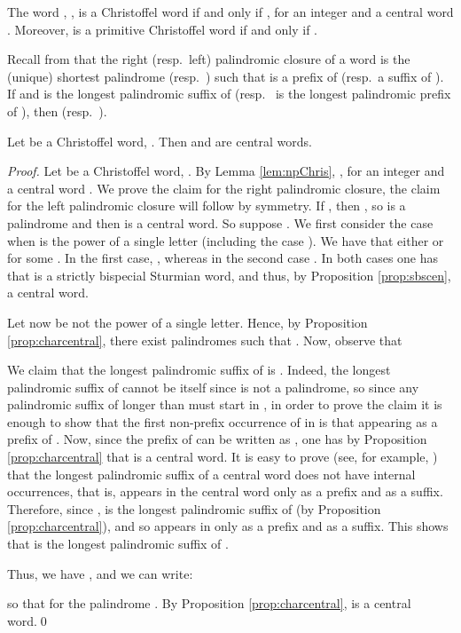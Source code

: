 \documentclass{llncs}
\begin{document}
\begin{lemma}\label{lem:npChris}
The word , , is a Christoffel word if and only if , for an integer  and a central word . Moreover,  is a primitive Christoffel word if and only if .
\end{lemma}

Recall from \cite{Del97} that the right (resp.~left) palindromic closure of a word  is the (unique) shortest palindrome  (resp.~) such that  is a prefix of  (resp.~a suffix of ). If  and  is the longest palindromic suffix of  (resp.~ is the longest palindromic prefix of ), then  (resp.~). 

\begin{lemma}\label{lem:rpl}
 Let  be a Christoffel word, . Then   and   are central words.
\end{lemma}

\begin{proof}
 Let  be a Christoffel word, .  By Lemma \ref{lem:npChris}, , for an integer  and a central word . We prove the claim for the right palindromic closure, the claim for the left palindromic closure will follow by symmetry. If , then , so  is a palindrome and then  is a central word. So suppose . We first consider the case when  is the power of a single letter (including the case ). We have that either  or  for some . In the first case, , whereas in the second case . In both cases one has that  is a strictly bispecial Sturmian word, and thus, by Proposition \ref{prop:sbscen}, a central word.

Let now  be not the power of a single letter. Hence, by Proposition \ref{prop:charcentral}, there exist palindromes  such that . Now, observe that 

We claim that the longest palindromic suffix of  is . Indeed, the longest palindromic suffix of  cannot be  itself since  is not a palindrome, so since any  palindromic suffix of  longer than  must start in , in order to prove the claim it is enough to show that the first non-prefix occurrence of  in  is that appearing as a prefix of . Now, since the prefix  of  can be written as , one has by Proposition \ref{prop:charcentral} that  is a central word. It is easy to prove (see, for example, \cite{BuDelFi12}) that the longest palindromic suffix of a central word does not have internal occurrences, that is, appears in the central word only as a prefix and as a suffix. Therefore, since ,  is the longest palindromic suffix of  (by Proposition \ref{prop:charcentral}), and so appears in  only as a prefix and as a suffix. This shows that  is the longest palindromic suffix of .

Thus, we have , and we can write: 

so that  for the palindrome . By Proposition \ref{prop:charcentral},  is a central word.\qed
\end{proof}
\end{document}
